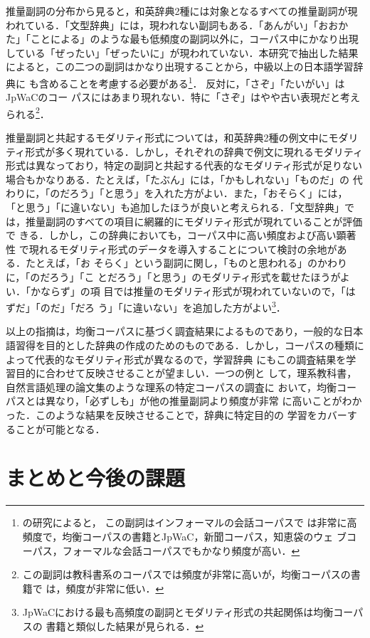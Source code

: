 \documentclass[japanese]{jnlp_1.4}
\begin{document}
推量副詞の分布から見ると，和英辞典2種には対象となるすべての推量副詞が現
われている．「文型辞典」には，現われない副詞もある．「あんがい」「おおか
た」「ことによる」のような最も低頻度の副詞以外に，コーパス中にかなり出現
している「ぜったい」「ぜったいに」が現われていない．本研究で抽出した結果
によると，この二つの副詞はかなり出現することから，中級以上の日本語学習辞典に
も含めることを考慮する必要がある\footnote{
	の研究によると，
	この副詞はインフォーマルの会話コーパスで
	は非常に高頻度で，均衡コーパスの書籍とJpWaC，新聞コーパス，知恵袋のウェ
	ブコーパス，フォーマルな会話コーパスでもかなり頻度が高い．}．
反対に，「さぞ」「たいがい」はJpWaCのコー
パスにはあまり現れない．特に「さぞ」はやや古い表現だと考えられる\footnote{
	この副詞は教科書系のコーパスでは頻度が非常に高いが，均衡コーパスの書籍で
	は，頻度が非常に低い．}．

推量副詞と共起するモダリティ形式については，和英辞典2種の例文中にモダリ
ティ形式が多く現れている．しかし，それぞれの辞典で例文に現れるモダリティ
形式は異なっており，特定の副詞と共起する代表的なモダリティ形式が足りない
場合もかなりある．たとえば，「たぶん」には，「かもしれない」「ものだ」の
代わりに，「のだろう」「と思う」を入れた方がよい．また，「おそらく」には，
「と思う」「に違いない」も追加したほうが良いと考えられる．「文型辞典」で
は，推量副詞のすべての項目に網羅的にモダリティ形式が現れていることが評価で
きる．しかし，この辞典においても，コーパス中に高い頻度および高い顕著性
で現れるモダリティ形式のデータを導入することについて検討の余地がある．たとえば，「お
そらく」という副詞に関し，「ものと思われる」のかわりに，「のだろう」「こ
とだろう」「と思う」のモダリティ形式を載せたほうがよい．「かならず」の項
目では推量のモダリティ形式が現われていないので，「はずだ」「のだ」「だろ
う」「に違いない」を追加した方がよい\footnote{
	JpWaCにおける最も高頻度の副詞とモダリティ形式の共起関係は均衡コーパスの
	書籍と類似した結果が見られる．}．

以上の指摘は，均衡コーパスに基づく調査結果によるものであり，一般的な日本
語習得を目的とした辞典の作成のためのものである．しかし，コーパスの種類に
よって代表的なモダリティ形式が異なるので\cite{Srdanovic2008a,Srdanovic2008c}，学習辞典
にもこの調査結果を学習目的に合わせて反映させることが望ましい．一つの例と
して，理系教科書，自然言語処理の論文集のような理系の特定コーパスの調査に
おいて，均衡コーパスとは異なり，「必ずしも」が他の推量副詞より頻度が非常
に高いことがわかった．このような結果を反映させることで，辞典に特定目的の
学習をカバーすることが可能となる．


\section{まとめと今後の課題}
\end{document}
